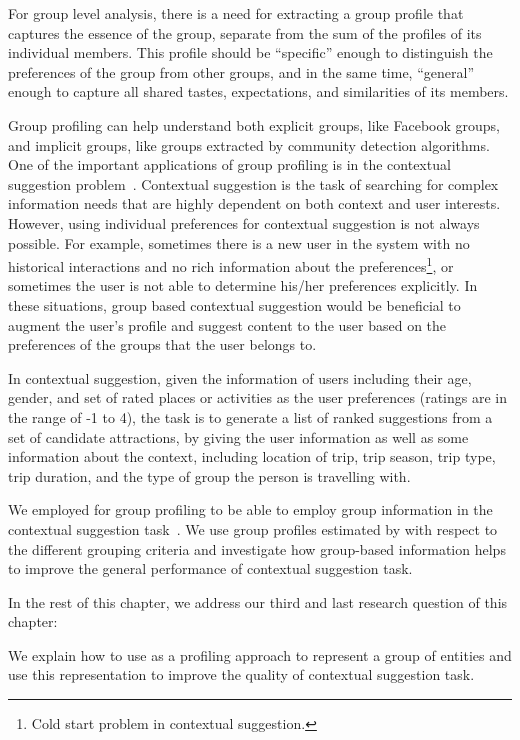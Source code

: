 For group level analysis, there is a need for extracting a group profile that captures the essence of the group, separate from the sum of the profiles of its individual members. This profile should be ``specific'' enough to distinguish the preferences of the group from other groups, and in the same time, ``general'' enough to capture all shared tastes, expectations, and similarities of its members. 

Group profiling can help understand both explicit groups, like Facebook groups, and implicit groups, like groups extracted by community detection algorithms. One of the important applications of group profiling is in the contextual suggestion problem~\citep{hashemioverview}.  
Contextual suggestion is the task of searching for complex information needs that are highly dependent on both context and user interests. However, using individual preferences for contextual suggestion is not always possible. 
For example, sometimes there is a new user in the system with no historical interactions and no rich information about the preferences\footnote{Cold start problem in contextual suggestion.}, or sometimes the user is not able to determine his/her preferences explicitly. In these situations, group based contextual suggestion would be beneficial to augment the user's profile and suggest content to the user based on the preferences of the groups that the user belongs to. 

In contextual suggestion, given the information of users including their age, gender, and set of rated places or activities as the user preferences (ratings are in the range of -1 to 4), the task is to generate a list of ranked suggestions from a set of candidate attractions, by giving the user information as well as some information about the context, including location of trip, trip season, trip type, trip duration, and the type of group the person is travelling with.

We employed \acswlm for group profiling to be able to employ group information in the contextual suggestion task~\citep{Dehghani2016:trec,Dehghani:2016:CHIIR,Hashemi:2015}. We use group profiles estimated by \acswlm with respect to the different grouping criteria and investigate how group-based information helps to improve the general performance of contextual suggestion task. 

In the rest of this chapter, we address our third and last research question of this chapter: 

We explain how to use \acswlm as a profiling approach to represent a group of entities and use this representation to improve the quality of contextual suggestion task.

